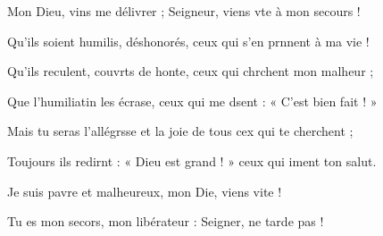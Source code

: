 \item Mon Dieu, vins me délivrer ;\psstar{} Seigneur, viens vte à mon secours !
\item Qu’ils soient humilis, déshonorés,\psstar{} ceux qui s’en prnnent à ma vie ! 
\item Qu’ils reculent, couvrts de honte,\psstar{} ceux qui chrchent mon malheur ;
\item Que l’humiliatin les écrase,\psstar{} ceux qui me dsent : « C’est bien fait ! »
\item Mais tu seras l’allégrsse et la joie\psstar{} de tous cex qui te cherchent ;
\item Toujours ils redirnt : « Dieu est grand ! »\psstar{} ceux qui iment ton salut.
\item Je suis pavre et malheureux,\psstar{} mon Die, viens vite !
\item Tu es mon secors, mon libérateur :\psstar{} Seigner, ne tarde pas !